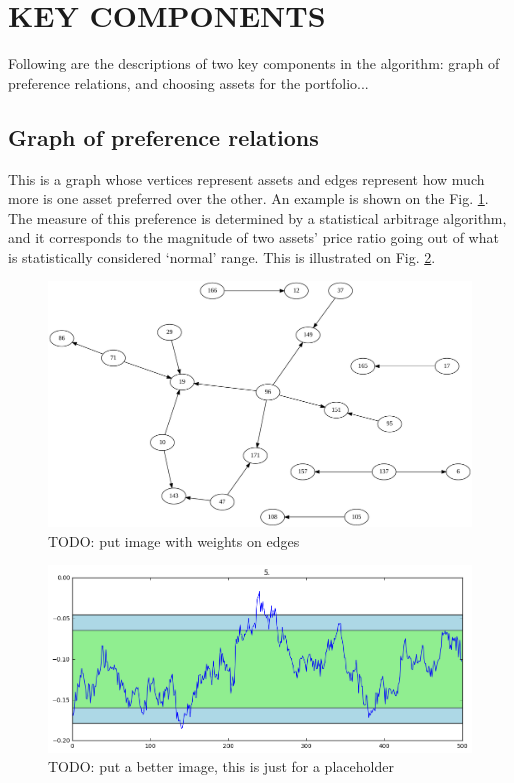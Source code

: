 \documentclass[letterpaper, 10 pt, conference]{ieeeconf}
\begin{document}
  \section{KEY COMPONENTS}
  
  Following are the descriptions of two key components in the algorithm: graph of preference relations, and choosing assets for the portfolio...
  
  \subsection{Graph of preference relations}
  
  This is a graph whose vertices represent assets and edges represent how much more is one asset preferred over the other.
  An example is shown on the Fig. \ref{fig:graph}.
  The measure of this preference is determined by a statistical arbitrage algorithm, and it corresponds to the magnitude of two assets' price ratio going out of what is statistically considered `normal' range.
  This is illustrated on Fig. \ref{fig:devmag}.
  
  \begin{figure}[htb]
    \centering
    \includegraphics[width=\columnwidth]{graphics/output_0573.pdf}
    \caption{TODO: put image with weights on edges}
    \label{fig:graph}
  \end{figure}
    
  \begin{figure}[htb]
    \centering
    \includegraphics[width=0.9\columnwidth]{graphics/deviation-magnitude.png}
    \caption{TODO: put a better image, this is just for a placeholder}
    \label{fig:devmag}
  \end{figure}
\end{document}
